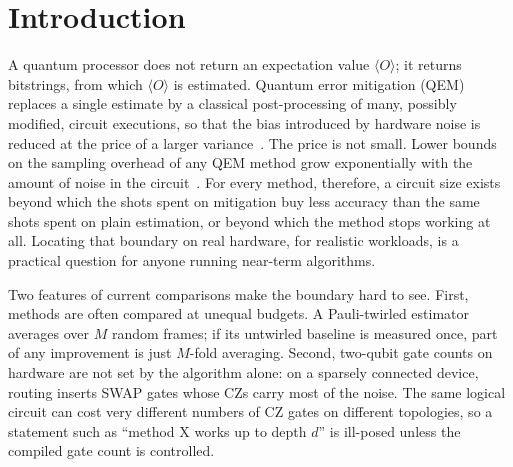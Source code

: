 \documentclass[conference]{IEEEtran}
\newcommand{\ev}[1]{\langle #1\rangle}
\begin{document}
\section{Introduction}

A quantum processor does not return an expectation value $\ev{O}$; it returns bitstrings,
from which $\ev{O}$ is estimated. Quantum error mitigation (QEM) replaces a single
estimate by a classical post-processing of many, possibly modified, circuit executions,
so that the bias introduced by hardware noise is reduced at the price of a larger
variance~\cite{temme2017,li2017,cai2023}. The price is not small. Lower bounds on the
sampling overhead of any QEM method grow exponentially with the amount of noise in the
circuit~\cite{takagi2022,quek2024}. For every method, therefore, a circuit size exists beyond
which the shots spent on mitigation buy less accuracy than the same shots spent on plain
estimation, or beyond which the method stops working at all. Locating that boundary on
real hardware, for realistic workloads, is a practical question for anyone running
near-term algorithms.

Two features of current comparisons make the boundary hard to see. First, methods are often
compared at unequal budgets. A Pauli-twirled estimator averages over $M$ random frames; if
its untwirled baseline is measured once, part of any improvement is just $M$-fold
averaging. Second, two-qubit gate counts on hardware are not set by the algorithm alone:
on a sparsely connected device, routing inserts SWAP gates whose CZs carry most of the
noise. The same logical circuit can cost very different numbers of CZ gates on different
topologies, so a statement such as ``method X works up to depth $d$'' is ill-posed unless the
compiled gate count is controlled.
\end{document}
